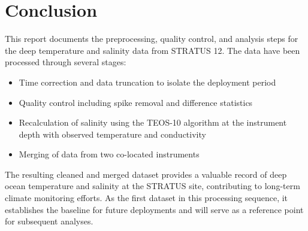 \documentclass[11pt]{article}
\newcommand{\projectname}{STRATUS}  %
\newcommand{\casenumber}{12}  %
\begin{document}
\section{Conclusion}
This report documents the preprocessing, quality control, and analysis steps 
for the deep temperature and salinity data from \projectname{} \casenumber{}. 
The data have been processed through several stages:

\begin{itemize}
    \item Time correction and data truncation to isolate the deployment period
    \item Quality control including spike removal and difference statistics
    \item Recalculation of salinity using the TEOS-10 algorithm at the instrument depth with observed temperature and conductivity
    \item Merging of data from two co-located instruments
\end{itemize}

The resulting cleaned and merged dataset provides a valuable record of deep ocean temperature and salinity 
at the \projectname{} site, contributing to long-term climate monitoring efforts. As the first dataset in this 
processing sequence, it establishes the baseline for future deployments and will serve as a reference point for 
subsequent analyses.
\end{document}
